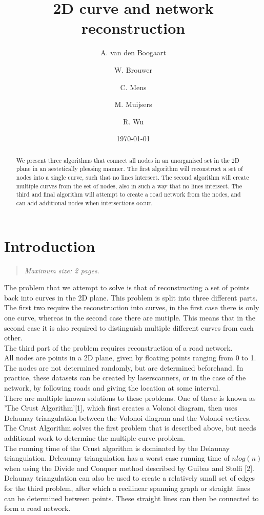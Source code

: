 \documentclass[11pt]{article}
\title{2D curve and network reconstruction}
\author{
A. van den Boogaart \and
W. Brouwer \and
C. Mens \and
M. Muijsers \and
R. Wu
}
\date{\today}
\newcommand{\maxsize}[1]{\begin{quotation} {\sl \noindent Maximum size: #1.} \end{quotation}}
\begin{document}
\newpage

\maketitle

\begin{abstract}
We present three algorithms that connect all nodes in an unorganised set in the 2D plane in an aestetically pleasing manner. 
The first algorithm will reconstruct a set of nodes into a single curve, such that no lines intersect. 
The second algorithm will create multiple curves from the set of nodes, also in such a way that no lines intersect. 
The third and final algorithm will attempt to create a road network from the nodes, and can add additional nodes when intersections occur.\\

\end{abstract}



\section{Introduction}
\label{se:introduction}
\maxsize{2 pages}
The problem that we attempt to solve is that of reconstructing a set of points back into curves in the 2D plane. 
This problem is split into three different parts. The first two require the reconstruction into curves, in the first case there is only one curve, whereas in the second case there are mutiple. 
This means that in the second case it is also required to distinguish multiple different curves from each other.\\
The third part of the problem requires reconstruction of a road network.\\
All nodes are points in a 2D plane, given by floating points ranging from 0 to 1. 
The nodes are not determined randomly, but are determined beforehand. In practice, these datasets can be created by laserscanners, or in the case of the network, by following roads and giving the location at some interval.\\
There are multiple known solutions to these problems. One of these is known as 'The Crust Algorithm'[1], which first creates a Volonoi diagram, then uses Delaunay triangulation between the Volonoi diagram and the Volonoi vertices.\\
The Crust Algorithm solves the first problem that is described above, but needs additional work to determine the multiple curve problem.\\
The running time of the Crust algorithm is dominated by the Delaunay triangulation. 
Deleaunay triangulation has a worst case running time of $nlog(n)$ when using the Divide and Conquer method described by Guibas and Stolfi [2].\\
Delaunay triangulation can also be used to create a relatively small set of edges for the third problem, after which a recilinear spanning graph or straight lines can be determined between points. These straight lines can then be connected to form a road network.\\
\end{document}
